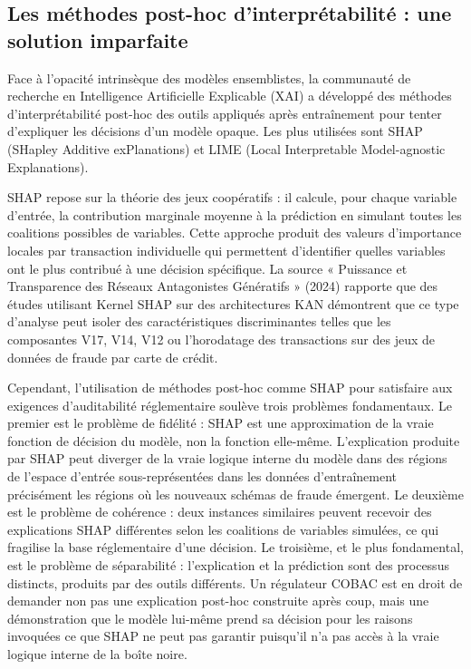 \documentclass[11pt,a4paper,oneside]{report}
\theoremstyle{definition}
\theoremstyle{remark}
\begin{document}
\subsection{Les méthodes post-hoc d'interprétabilité : une solution imparfaite}

Face à l'opacité intrinsèque des modèles ensemblistes, la communauté de recherche en Intelligence Artificielle Explicable (XAI) a développé des méthodes d'interprétabilité post-hoc  des outils appliqués après entraînement pour tenter d'expliquer les décisions d'un modèle opaque. Les plus utilisées sont SHAP (SHapley Additive exPlanations) et LIME (Local Interpretable Model-agnostic Explanations).

SHAP repose sur la théorie des jeux coopératifs : il calcule, pour chaque variable d'entrée, la contribution marginale moyenne à la prédiction en simulant toutes les coalitions possibles de variables. Cette approche produit des valeurs d'importance locales  par transaction individuelle  qui permettent d'identifier quelles variables ont le plus contribué à une décision spécifique. La source « Puissance et Transparence des Réseaux Antagonistes Génératifs » (2024) rapporte que des études utilisant Kernel SHAP sur des architectures KAN démontrent que ce type d'analyse peut isoler des caractéristiques discriminantes telles que les composantes V17, V14, V12 ou l'horodatage des transactions sur des jeux de données de fraude par carte de crédit.

Cependant, l'utilisation de méthodes post-hoc comme SHAP pour satisfaire aux exigences d'auditabilité réglementaire soulève trois problèmes fondamentaux. Le premier est le problème de fidélité : SHAP est une approximation de la vraie fonction de décision du modèle, non la fonction elle-même. L'explication produite par SHAP peut diverger de la vraie logique interne du modèle dans des régions de l'espace d'entrée sous-représentées dans les données d'entraînement  précisément les régions où les nouveaux schémas de fraude émergent. Le deuxième est le problème de cohérence : deux instances similaires peuvent recevoir des explications SHAP différentes selon les coalitions de variables simulées, ce qui fragilise la base réglementaire d'une décision. Le troisième, et le plus fondamental, est le problème de séparabilité : l'explication et la prédiction sont des processus distincts, produits par des outils différents. Un régulateur COBAC est en droit de demander non pas une explication post-hoc construite après coup, mais une démonstration que le modèle lui-même prend sa décision pour les raisons invoquées  ce que SHAP ne peut pas garantir puisqu'il n'a pas accès à la vraie logique interne de la boîte noire.
\end{document}
